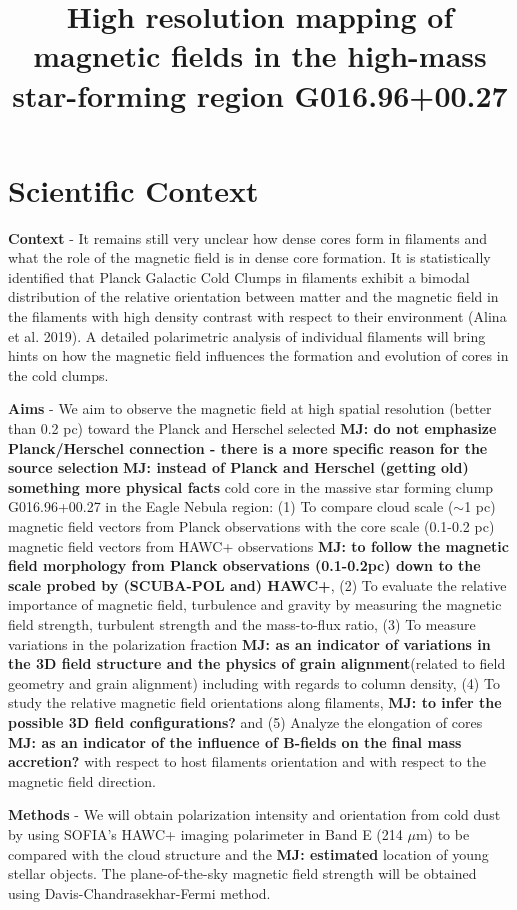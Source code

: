\documentclass[11pt]{amsart}
\title{High resolution mapping of magnetic fields in the high-mass star-forming region  G016.96+00.27}
\begin{document}
\maketitle


\section{Scientific Context}
{\bf Context} - It remains still very unclear how dense cores form in filaments and what the role of the  magnetic field is in dense core formation. 
It is statistically identified that Planck Galactic Cold Clumps in filaments exhibit a bimodal distribution of the relative orientation between matter and the magnetic field in the filaments with high density contrast with respect to their environment (Alina et al. 2019).  A detailed polarimetric analysis of individual filaments will bring hints on how the magnetic field influences the formation and evolution of cores in the cold clumps.


{\bf Aims} - We aim to observe the magnetic field at high spatial resolution (better than 0.2 pc) toward
the Planck and Herschel selected 
{\bf MJ: do not emphasize Planck/Herschel connection - there is a more specific reason for the source selection}
{\bf MJ: instead of Planck and Herschel (getting old) something more physical facts}
cold core in the massive star forming clump G016.96+00.27 in the Eagle Nebula region:
(1) To compare cloud scale ($\sim$1 pc) magnetic field vectors from Planck observations with the core scale (0.1-0.2 pc) magnetic field vectors from HAWC+ observations
{\bf MJ: to follow the magnetic field morphology from Planck observations (0.1-0.2pc) down to the scale probed by (SCUBA-POL and) HAWC+}, 
(2) To evaluate the relative importance of magnetic field, turbulence and gravity by measuring the magnetic field strength, turbulent strength and the mass-to-flux ratio, (3) To measure variations in the polarization fraction 
{\bf MJ: as an indicator of variations in the 3D field structure and the physics of grain alignment}(related to field geometry and grain alignment) including with regards to column density,  (4) To study the relative magnetic field orientations along filaments,
{\bf MJ: to infer the possible 3D field configurations?}
and 
(5) Analyze the elongation of cores 
{\bf MJ: as an indicator of the influence of B-fields on the final mass accretion?}
with respect to host filaments orientation and with respect to the magnetic field direction.  

{\bf Methods} - 
We will obtain polarization intensity and orientation from cold dust by using SOFIA's HAWC+ imaging polarimeter in Band E (214 $\mu$m) to be compared with the cloud structure and the 
{\bf MJ: estimated}
location of young stellar objects. The plane-of-the-sky magnetic field strength will be obtained using Davis-Chandrasekhar-Fermi method. 
\end{document}
